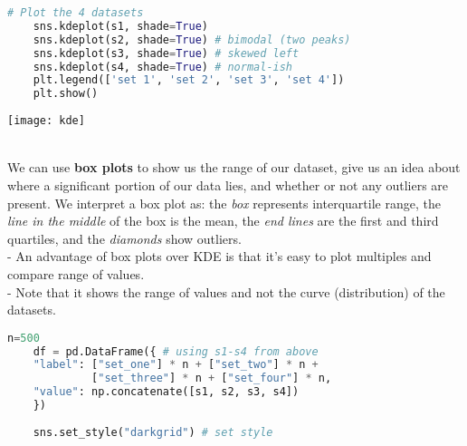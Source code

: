 \documentclass[11pt, a4paper]{article}
\begin{document}
\begin{spacing}{1.1}
\begin{minipage}[c]{10.3cm}
\begin{lstlisting}[language=Python]
	# Plot the 4 datasets
	sns.kdeplot(s1, shade=True) 
	sns.kdeplot(s2, shade=True) # bimodal (two peaks)
	sns.kdeplot(s3, shade=True) # skewed left
	sns.kdeplot(s4, shade=True) # normal-ish
	plt.legend(['set 1', 'set 2', 'set 3', 'set 4'])
	plt.show() \end{lstlisting}\vspace*{1mm}
	\end{minipage}
	\begin{minipage}[c]{10cm}
	\texttt{[image: kde]}
	\end{minipage} \\
	We can use \textbf{box plots} to show us the range of our dataset, give us an idea about where a significant portion of our data lies, and whether or not any outliers are present. We interpret a box plot as: the \textit{box} represents interquartile range, the \textit{line in the middle} of the box is the mean, the \textit{end lines} are the first and third quartiles, and the \textit{diamonds} show outliers. \\
	\hspace*{3mm} - An advantage of box plots over KDE is that it's easy to plot multiples and compare range of values. \\
	\hspace*{3mm} - Note that it shows the range of values and not the curve (distribution) of the datasets. \\
	\begin{minipage}[c]{10.3cm}
	\begin{lstlisting}[language=Python]
	n=500
	df = pd.DataFrame({ # using s1-s4 from above
	"label": ["set_one"] * n + ["set_two"] * n + 
	         ["set_three"] * n + ["set_four"] * n,
	"value": np.concatenate([s1, s2, s3, s4])
	})
	
	sns.set_style("darkgrid") # set style
	

\end{lstlisting}
\end{minipage}
\end{spacing}
\end{document}
